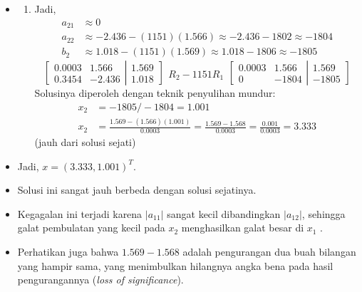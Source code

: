 \documentclass[pdflatex,compress,mathserif]{beamer}
\begin{document}
\begin{frame}
	\begin{itemize}
		\item[]
		\begin{enumerate}
			\item[] Jadi,
			\begin{align*}
				a_{21} &\approx 0 \\
				a_{22} &\approx -2.436 - (1151)(1.566) \approx -2.436 - 1802 \approx -1804 \\
				b_2 &\approx 1.018 - (1151)(1.569) \approx 1.018 - 1806 \approx -1805
			\end{align*}
			\[
			\left[
				\begin{matrix}
					0.0003 & 1.566 \\
					0.3454 & -2.436
				\end{matrix}
			\right|
			\left.
				\begin{matrix}
					1.569 \\ 1.018
				\end{matrix}
			\right]
			\begin{matrix}
				\\
				R_2 -1151R_1
			\end{matrix}
			\left[
				\begin{matrix}
					0.0003 & 1.566 \\
					0 & -1804
				\end{matrix}
			\right|
			\left.
				\begin{matrix}
					1.569 \\ -1805
				\end{matrix}
			\right]
			\]
			Solusinya diperoleh dengan teknik penyulihan mundur:
			\begin{align*}
				x_2 &= -1805/-1804 = 1.001 \\
				x_2 &= \frac{1.569 - ( 1.566 )( 1.001 )}{0.0003} = \frac{1.569 - 1.568}{0.0003} = \frac{0.001}{0.0003} = 3.333
			\end{align*}
			(jauh dari solusi sejati)
		\end{enumerate}
	\end{itemize}
\end{frame}

\begin{frame}
	\begin{itemize}
		\item Jadi, $ x = (3.333, 1.001)^T $.
		\item Solusi ini sangat jauh berbeda dengan solusi sejatinya.
		\item Kegagalan ini terjadi karena $ | a_{11} | $ sangat kecil dibandingkan $ |a_{12} | $, sehingga galat pembulatan yang kecil pada $ x_2 $ menghasilkan galat besar di $ x_1 $ .
		\item Perhatikan juga bahwa $ 1.569 - 1.568 $ adalah pengurangan dua buah bilangan yang hampir sama, yang menimbulkan hilangnya angka bena pada hasil pengurangannya (\textit{loss of significance}).
	\end{itemize}
\end{frame}
\end{document}
